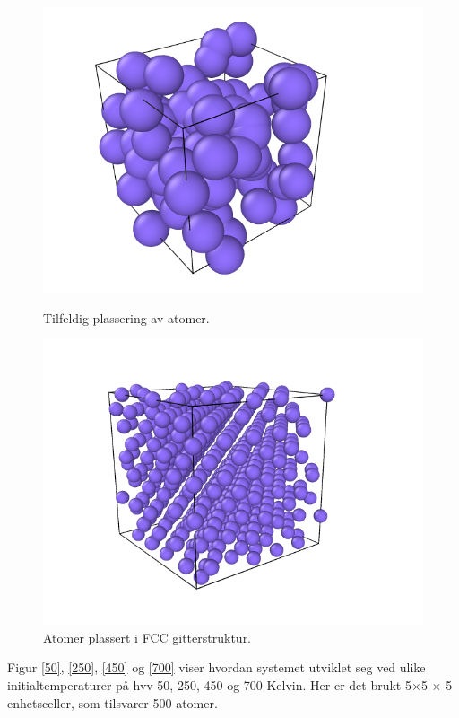 \documentclass[paper=a4, fontsize=11pt]{scrartcl} %
\numberwithin{equation}{section} %
\numberwithin{figure}{section} %
\numberwithin{table}{section} %
\begin{document}
 \FloatBarrier
\begin{figure}[!htb]
  \includegraphics[width=\linewidth]{5cnoFCC.png}
  \caption{Tilfeldig plassering av atomer.}\label{fcuk}
\endminipage\hfill
{}
  \includegraphics[width=\linewidth]{5cFCC.png}
  \caption{Atomer plassert i FCC gitterstruktur.}\label{fcuk2}
\endminipage\hfill
\end{figure}
 \FloatBarrier
 
Figur \ref{50}, \ref{250}, \ref{450} og \ref{700} viser hvordan systemet utviklet seg ved ulike initialtemperaturer på hvv 50, 250, 450 og 700 Kelvin. Her er det brukt 5$\times$5 $\times$ 5 enhetsceller, som tilsvarer 500 atomer. 
 
\end{document}
